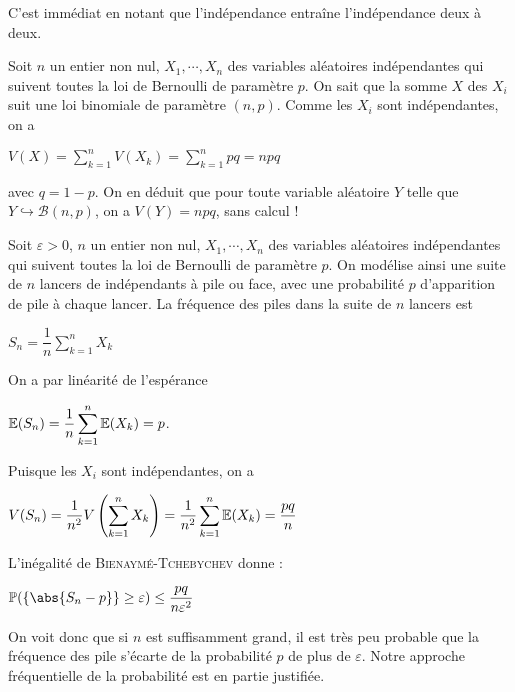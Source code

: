 \documentclass[12pt,a4paper]{report}
\begin{document}
\begin{demo}{}
C'est immédiat en notant que l'indépendance entraîne l'indépendance deux à deux.
\end{demo}

\begin{exemple}{}
Soit $n$ un entier non nul, $X_1,\cdots,X_n$ des variables aléatoires indépendantes qui suivent toutes la loi de Bernoulli de paramètre $p$. On sait que la somme $X$ des $X_i$ suit une loi binomiale de paramètre $(n,p)$. Comme les $X_i$ sont indépendantes, on a 
\begin{center}
$V(X)=\displaystyle \sum_{k=1}^n V(X_k) = \sum_{k=1}^n pq = npq$
\end{center}
avec $q= 1-p$. On en déduit que pour toute variable aléatoire $Y$ telle que $Y \hookrightarrow \mathcal{B}(n,p)$, on a $V(Y) = npq$, sans calcul !
\end{exemple}

\begin{exemple}{}
Soit $\varepsilon > 0$, $n$ un entier non nul, $X_1,\cdots,X_n$ des variables aléatoires indépendantes qui suivent toutes la loi de Bernoulli de paramètre $p$. On modélise ainsi une suite de $n$ lancers de indépendants à pile ou face, avec une probabilité $p$ d'apparition de pile à chaque lancer. La fréquence des piles dans la suite de $n$ lancers est 
\begin{center}
$S_n = \dfrac{1}{n} \displaystyle \sum_{k=1}^n X_k$
\end{center}

On a par linéarité de l'espérance 
\begin{center}
$\mathbb{E}(S_n) = \dfrac{1}{n} \displaystyle \sum_{k=1}^n \mathbb{E}(X_k) = p$.
\end{center}

Puisque les $X_i$ sont indépendantes, on a 
\begin{center}
$V(S_n) = \displaystyle \dfrac{1}{n^2} V\left(\sum_{k=1}^n X_k\right) = \dfrac{1}{n^2} \sum_{k=1}^n  \mathbb{E}(X_k) = \dfrac{pq}{n}$
\end{center}
L'inégalité de \textsc{Bienaymé-Tchebychev} donne :
\begin{center}
$\p(\{\abs{S_n-p}\} \ge \varepsilon) \le \dfrac{pq}{n\varepsilon^2}$
\end{center}

On voit donc que si $n$ est suffisamment grand, il est très peu probable que la fréquence des pile s'écarte de la probabilité $p$ de plus de $\varepsilon$. Notre approche fréquentielle de la probabilité est en partie justifiée.
\end{exemple}
\end{document}
